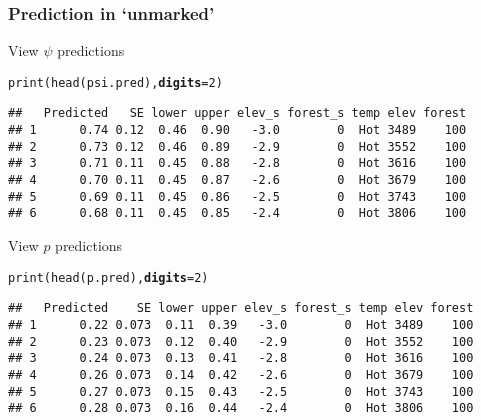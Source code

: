 \documentclass[color=usenames,dvipsnames]{beamer}\usepackage[]{graphicx}\usepackage[]{xcolor}
\makeatletter
\newcommand{\hlnum}[1]{\textcolor[rgb]{0.69,0.494,0}{#1}}%
\newcommand{\hldef}[1]{\textcolor[rgb]{0,0,0}{#1}}%
\newcommand{\hlkwc}[1]{\textcolor[rgb]{0,0,0}{\textbf{#1}}}%
\newcommand{\hlkwd}[1]{\textcolor[rgb]{0.004,0.004,0.506}{#1}}%
\newenvironment{kframe}{%
 \def\at@end@of@kframe{}%
 \ifinner\ifhmode%
  \def\at@end@of@kframe{\end{minipage}}%
  \begin{minipage}{\columnwidth}%
 \fi\fi%
 \def\FrameCommand##1{\hskip\@totalleftmargin \hskip-\fboxsep
 \colorbox{shadecolor}{##1}\hskip-\fboxsep
     \hskip-\linewidth \hskip-\@totalleftmargin \hskip\columnwidth}%
 \MakeFramed {\advance\hsize-\width
   \@totalleftmargin\z@ \linewidth\hsize
   \@setminipage}}%
 {\par\unskip\endMakeFramed%
 \at@end@of@kframe}
\newenvironment{knitrout}{}{} %
\makeatother
\begin{document}
\begin{frame}[fragile]
  \frametitle{Prediction in `unmarked'}
  \small
  View $\psi$ predictions
\begin{knitrout}\footnotesize
{}\color{fgcolor}\begin{kframe}
\begin{alltt}
\hlkwd{print}\hldef{(}\hlkwd{head}\hldef{(psi.pred),} \hlkwc{digits}\hldef{=}\hlnum{2}\hldef{)}
\end{alltt}
\begin{verbatim}
##   Predicted   SE lower upper elev_s forest_s temp elev forest
## 1      0.74 0.12  0.46  0.90   -3.0        0  Hot 3489    100
## 2      0.73 0.12  0.46  0.89   -2.9        0  Hot 3552    100
## 3      0.71 0.11  0.45  0.88   -2.8        0  Hot 3616    100
## 4      0.70 0.11  0.45  0.87   -2.6        0  Hot 3679    100
## 5      0.69 0.11  0.45  0.86   -2.5        0  Hot 3743    100
## 6      0.68 0.11  0.45  0.85   -2.4        0  Hot 3806    100
\end{verbatim}
\end{kframe}
\end{knitrout}
\pause
\vfill
  View $p$ predictions
\begin{knitrout}\footnotesize
{}\color{fgcolor}\begin{kframe}
\begin{alltt}
\hlkwd{print}\hldef{(}\hlkwd{head}\hldef{(p.pred),} \hlkwc{digits}\hldef{=}\hlnum{2}\hldef{)}
\end{alltt}
\begin{verbatim}
##   Predicted    SE lower upper elev_s forest_s temp elev forest
## 1      0.22 0.073  0.11  0.39   -3.0        0  Hot 3489    100
## 2      0.23 0.073  0.12  0.40   -2.9        0  Hot 3552    100
## 3      0.24 0.073  0.13  0.41   -2.8        0  Hot 3616    100
## 4      0.26 0.073  0.14  0.42   -2.6        0  Hot 3679    100
## 5      0.27 0.073  0.15  0.43   -2.5        0  Hot 3743    100
## 6      0.28 0.073  0.16  0.44   -2.4        0  Hot 3806    100
\end{verbatim}
\end{kframe}
\end{knitrout}
\end{frame}
\end{document}
